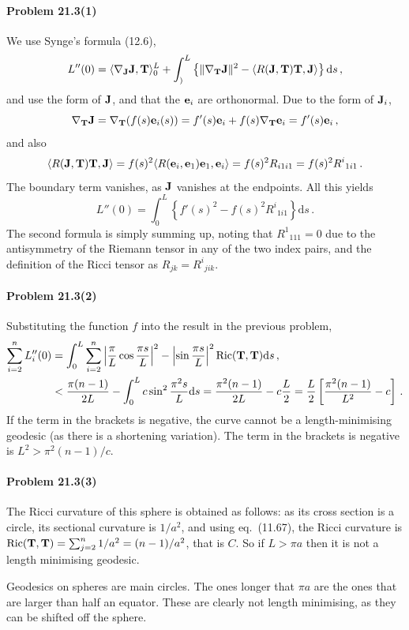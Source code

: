 \documentclass[a4paper,12pt]{article}
\def\d{\mathrm{d}}
\newcommand{\problem}[1]{\paragraph{Problem #1}}
\begin{document}

\problem{21.3(1)} We use Synge's formula (12.6),
\[
 L''(0) = \langle \nabla_{\bf J} {\bf J}, {\bf T}\rangle_0^L +\int_)^L \left\{ \|\nabla_{\bf T}{\bf J}\|^2 - \langle R({\bf J}, {\bf T}){\bf T}, {\bf J}\rangle\right\}\d s\,,
\]
and use the form of ${\bf J}$, and that the ${\bf e}_i$ are orthonormal. Due to the form of ${\bf J}_i$,
\[
 \nabla_{\bf T}{\bf J} = \nabla_{\bf T}(f(s){\bf e}_i(s)) = f'(s){\bf e}_i + f(s)\nabla_{\bf T}{\bf e}_i = f'(s){\bf e}_i\,,
\]
and also
\[
 \langle R({\bf J}, {\bf T}){\bf T}, {\bf J}\rangle = f(s)^2 \langle R({\bf e}_i, {\bf e}_1){\bf e}_1, {\bf e}_i\rangle = f(s)^2 R_{i1i1}  = f(s)^2 R^i{}_{1i1}\,.
\]
The boundary term vanishes, as ${\bf J}$ vanishes at the endpoints. All this yields
\[
 L''(0) = \int_0^L\left\{ f'(s)^2 - f(s)^2R^i{}_{1i1}\right\}\d s\,.
\]
The second formula is simply summing up, noting that $R^1{}_{111}=0$ due to the antisymmetry of the Riemann tensor in any of the two index pairs, and the definition of the Ricci tensor as $R_{jk}=R^i{}_{jik}$.



\problem{21.3(2)} Substituting the function $f$ into the result in the previous problem,
\[
\begin{aligned}
 \sum_{i=2}^n L_i''(0) &= \int_0^L \sum_{i=2}^n \left| \frac{\pi}{L}\cos\frac{\pi s}{L}\right|^2 -\left|\sin\frac{\pi s}{L}\right|^2 {\rm Ric}({\bf T}, {\bf T})\d s\,,\\
 &< \frac{\pi (n-1)}{2 L} - \int_0^L c \sin^2 \frac{\pi^2 s}{L} \d s = \frac{\pi^2(n-1)}{2L} - c \frac{L}{2} = \frac{L}{2}\left[ \frac{\pi^2(n-1)}{L^2}-c\right]\,.
\end{aligned}
\]
If the term in the brackets is negative, the curve cannot be a length-minimising geodesic (as there is a shortening variation). The term in the brackets is negative is $L^2 > \pi^2(n-1)/c$.


\problem{21.3(3)} The Ricci curvature of this sphere is obtained as follows: as its cross section is a circle, its sectional curvature is $1/a^2$, and using eq.\ (11.67), the Ricci curvature is ${\rm Ric}({\bf T}, {\bf T}) = \sum_{j=2}^n 1/a^2 = (n-1)/a^2$, that is $C$. So if $L>\pi a$ then it is not a length minimising geodesic.

Geodesics on spheres are main circles. The ones longer that $\pi a$ are the ones that are larger than half an equator. These are clearly not length minimising, as they can be shifted off the sphere.
\end{document}
